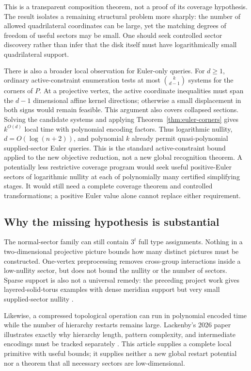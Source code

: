 \documentclass[11pt,letterpaper]{article}
\theoremstyle{definition}
\theoremstyle{remark}\newtheorem{remark}[theorem]{Remark}
\begin{document}
This is a transparent composition theorem, not a proof of its coverage
hypothesis. The result isolates a remaining structural problem more sharply:
the number of allowed quadrilateral coordinates can be large, yet the
matching degrees of freedom of useful sectors may be small. One should
seek controlled sector discovery rather than infer that the disk itself
must have logarithmically small quadrilateral support.

There is also a broader local observation for Euler-only queries. For
$d\ge1$, ordinary active-constraint enumeration tests at most
$\binom{k}{d-1}$ systems for the corners of $P$. At a projective vertex,
the active coordinate inequalities must span the $d-1$ dimensional affine
kernel directions; otherwise a small displacement in both signs would
remain feasible. This argument also covers collapsed sections. Solving
the candidate systems and applying Theorem~\ref{thm:euler-corners} gives
$k^{O(d)}$ local time with polynomial encoding factors. Thus logarithmic
nullity, $d=O(\log(n+2))$, and polynomial $k$ already permit
quasi-polynomial supplied-sector Euler queries. This is the standard
active-constraint bound applied to the new objective reduction, not a
new global recognition theorem. A potentially less restrictive coverage
program would seek useful positive-Euler sectors of logarithmic nullity
at each of polynomially many certified simplifying stages. It would
still need a complete coverage theorem and controlled transformations;
a positive Euler value alone cannot replace either requirement.

\subsection{Why the missing hypothesis is substantial}

The normal-sector family can still contain $3^t$ full type assignments.
Nothing in a two-dimensional projective picture bounds how many distinct
pictures must be constructed. One-vertex preprocessing removes cross-group
interactions inside a low-nullity sector, but does not bound the nullity
or the number of sectors. Sparse support is also not a universal remedy:
the preceding project work gives layered-solid-torus examples with dense
meridian support but very small supplied-sector nullity
\cite{minimumenvelopes,sectorintegration}.

Likewise, a compressed topological operation can run in polynomial encoded
time while the number of hierarchy restarts remains large. Lackenby's
2026 paper illustrates exactly why hierarchy length, pattern complexity,
and intermediate encodings must be tracked separately
\cite{lackenby2026}. This article supplies a complete local primitive
with useful bounds; it supplies neither a new global restart potential
nor a theorem that all necessary sectors are low-dimensional.
\end{document}
